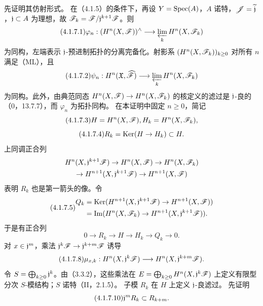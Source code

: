 先证明其仿射形式。
在（4.1.5）的条件下，再设 $Y=\operatorname{Spec}(A)$，$A$ 诺特，$\mathscr J=\widetilde{\mathfrak j}$，$\mathfrak j\subset A$ 为理想，故 $\mathscr F_k=\mathscr F/\mathfrak j^{k+1}\mathscr F$。则
\begin{equation}\tag{4.1.7.1}
\varphi_n:(H^n(X,\F))^\wedge\longrightarrow\plim_kH^n(X,\F_k)
\end{equation}
为同构，左端表示 $\mathfrak j$-预进制拓扑的分离完备化。射影系 $(H^n(X,\mathscr F_k))_{k\ge0}$ 对所有 $n$ 满足（ML），且
\begin{equation}\tag{4.1.7.2}
\psi_n:H^n(\mathfrak X,\widehat\F)\longrightarrow\plim_kH^n(X,\F_k)
\end{equation}
为同构。此外，由典范同态 $H^n(X,\mathscr F)\to H^n(X,\mathscr F_k)$ 的核定义的滤过是 $\mathfrak j$-良的（0，13.7.7），而 $\varphi_n$ 为拓扑同构。
\eproof
在本证明中固定 $n\ge0$，简记
\begin{equation}\tag{4.1.7.3}H=H^n(X,\F),\qquad H_k=H^n(X,\F_k),\end{equation}
\begin{equation}\tag{4.1.7.4}R_k=\Ker(H\to H_k)\subset H.\end{equation}
上同调正合列
\[
\begin{gathered}
H^n(X,\mathfrak j^{k+1}\mathscr F)\to H^n(X,\mathscr F)\to H^n(X,\mathscr F_k)\\
\to H^{n+1}(X,\mathfrak j^{k+1}\mathscr F)\to H^{n+1}(X,\mathscr F)
\end{gathered}
\]
表明 $R_k$ 也是第一箭头的像。令
\begin{equation}\tag{4.1.7.5}
\begin{aligned}
Q_k&=\Ker(H^{n+1}(X,\frj^{k+1}\F)\to H^{n+1}(X,\F))\\
&=\Im(H^n(X,\F_k)\to H^{n+1}(X,\frj^{k+1}\F)).
\end{aligned}
\end{equation}
于是有正合列
\begin{equation}\tag{4.1.7.6}0\to R_k\to H\to H_k\to Q_k\to0.\end{equation}
对 $x\in\mathfrak j^m$，乘法 $\mathfrak j^k\mathscr F\to\mathfrak j^{k+m}\mathscr F$ 诱导
\begin{equation}\tag{4.1.7.8}
\mu_{x,k}:H^n(X,\frj^k\F)\longrightarrow H^n(X,\frj^{k+m}\F).
\end{equation}
令 $S=\bigoplus_{k\ge0}\mathfrak j^k$。由（3.3.2），这些乘法在 $E=\bigoplus_{k\ge0}H^n(X,\mathfrak j^k\mathscr F)$ 上定义有限型分次 $S$-模结构；$S$ 诺特（II，2.1.5）。
子模 $R_k$ 在 $H$ 上定义 $\mathfrak j$-良滤过。
\eproof
先证明
\begin{equation}\tag{4.1.7.10}\frj^mR_k\subset R_{k+m}.\end{equation}

